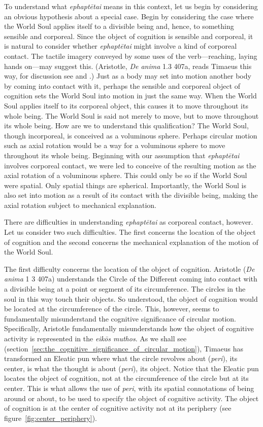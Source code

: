 To understand what \emph{ephaptētai} means in this context, let us begin by considering an obvious hypothesis about a special case. Begin by considering the case where the World Soul applies itself to a divisible being and, hence, to something sensible and corporeal. Since the object of cognition is sensible and corporeal, it is natural to consider whether \emph{ephaptētai} might involve a kind of corporeal contact. The tactile imagery conveyed by some uses of the verb---reaching, laying hands on---may suggest this. (Aristotle, \emph{De anima} 1.3 407a, reads Timaeus this way, for discussion see \citealt[392--5, 404--7]{Cherniss:1944aa} and \citealt[82--6]{Lee:1976xs}.) Just as a body may set into motion another body by coming into contact with it, perhaps the sensible and corporeal object of cognition sets the World Soul into motion in just the same way. When the World Soul applies itself to its corporeal object, this causes it to move throughout its whole being. The World Soul is said not merely to move, but to move throughout its whole being. How are we to understand this qualification? The World Soul, though incorporeal, is conceived as a voluminous sphere. Perhaps circular motion such as axial rotation would be a way for a voluminous sphere to move throughout its whole being. Beginning with our assumption that \emph{ephaptētai} involves corporeal contact, we were led to conceive of the resulting motion as the axial rotation of a voluminous sphere. This could only be so if the World Soul were spatial. Only spatial things are spherical. Importantly, the World Soul is also set into motion as a result of its contact with the divisible being, making the axial rotation subject to mechanical explanation.

There are difficulties in understanding \emph{ephaptētai} as corporeal contact, however. Let us consider two such difficulties. The first concerns the location of the object of cognition and the second concerns the mechanical explanation of the motion of the World Soul.

The first difficulty concerns the location of the object of cognition. Aristotle (\emph{De anima} 1 3 407a) understands the Circle of the Different coming into contact with a divisible being at a point or segment of its circumference. The circles in the soul in this way touch their objects. So understood, the object of cognition would be located at the circumference of the circle. This, however, seems to fundamentally misunderstand the cognitive significance of circular motion. Specifically, Aristotle fundamentally misunderstands how the object of cognitive activity is represented in the \emph{eikōs muthos}. As we shall see (section~\ref{sec:the_cognitive_significance_of_circular_motion}), Timaeus has transformed an Eleatic pun where what the circle revolves about (\emph{peri}), its center, is what the thought is about (\emph{peri}), its object. Notice that the Eleatic pun locates the object of cognition, not at the circumference of the circle but at its center. This is what allows the use of \emph{peri}, with its spatial connotations of being around or about, to be used to specify the object of cognitive activity. The object of cognition is at the center of cognitive activity not at its periphery (see figure~\ref{fig:center_periphery}).


